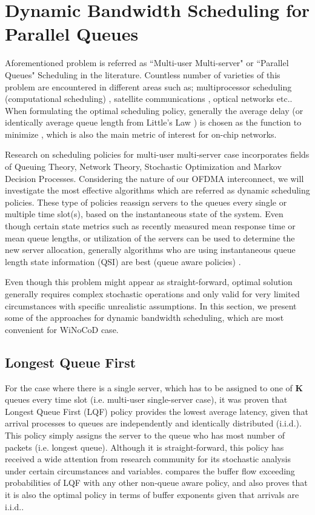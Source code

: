 \section{Dynamic Bandwidth Scheduling for Parallel Queues}

Aforementioned problem is referred as ``Multi-user Multi-server" or ``Parallel Queues" Scheduling in the literature. Countless number of varieties of this problem are encountered in different areas such as; multiprocessor scheduling (computational scheduling) \cite{shivaratri1992load}, satellite communications \cite{ganti2002tranmission}, optical networks \cite{ji2013design} etc.. When formulating the optimal scheduling policy, generally the average delay (or identically average queue length from Little's Law \cite{little2008little}) is chosen as the function to minimize \cite{kunz1991influence}, which is also the main metric of interest for on-chip networks.  

Research on scheduling policies for multi-user multi-server case incorporates fields of Queuing Theory, Network Theory, Stochastic Optimization and Markov Decision Processes. Considering the nature of our OFDMA interconnect, we will investigate the most effective algorithms which are referred as dynamic scheduling policies. These type of policies reassign servers to the queues every single or multiple time slot(s), based on the instantaneous state of the system. Even though certain state metrics such as recently measured mean response time or mean queue lengths, or utilization of the servers can be used to determine the new server allocation, generally algorithms who are using instantaneous queue length state information (QSI) are best (queue aware policies) \cite{kunz1991influence}. 

Even though this problem might appear as straight-forward, optimal solution generally requires complex stochastic operations and only valid for very limited circumstances with specific unrealistic assumptions. In this section, we present some of the approaches for dynamic bandwidth scheduling, which are most convenient for WiNoCoD case. 

\subsection{Longest Queue First}

For the case where there is a single server, which has to be assigned to one of \textbf{K} queues every time slot (i.e. multi-user single-server case), it was proven that Longest Queue First (LQF) policy provides the lowest average latency, given that arrival processes to queues are independently and identically distributed (i.i.d.). This policy simply assigns the server to the queue who has most number of packets (i.e. longest queue). Although it is straight-forward, this policy has received a wide attention from research community for its stochastic analysis under certain circumstances and variables. \cite{jagannathan2013impact} compares the buffer flow exceeding probabilities of LQF with any other non-queue aware policy, and also proves that it is also the optimal policy in terms of buffer exponents given that arrivals are i.i.d..

